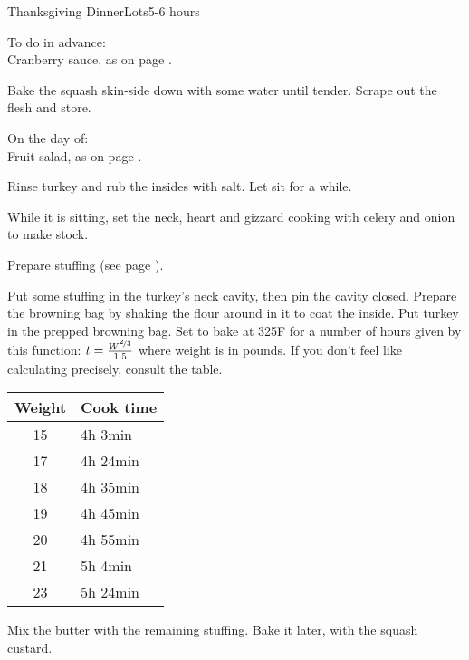\documentclass[../Cookbook.tex]{subfiles}
\begin{document}
\begin{recipe}{Thanksgiving Dinner}{Lots}{5-6 hours}

To do in advance: \\
Cranberry sauce, as on page \pageref{CranberrySauce}.

Bake the squash skin-side down with some water until tender.
Scrape out the flesh and store.

\newstep
On the day of: \\
Fruit salad, as on page \pageref{FruitSalad}.

Rinse turkey and rub the insides with salt. Let sit for a while.

While it is sitting, set the neck, heart and gizzard cooking with celery and onion to make stock.

Prepare stuffing (see page \pageref{Stuffing}).

\begin{minipage}{.7\textwidth}
	Put some stuffing in the turkey's neck cavity, then pin the cavity closed.
	Prepare the browning bag by shaking the flour around in it to coat the inside.
	Put turkey in the prepped browning bag.
	Set to bake at 325\0F for a number of hours given by this function:
	$ t = \frac{W^{\nicefrac{2}{3}}}{1.5} $
	where weight is in pounds.
	If you don't feel like calculating precisely, consult the table.
\end{minipage}
\begin{minipage}{.29\textwidth}
	\begin{tabular}{c|l}
		Weight & Cook time \\ \hline
		15 & 4h 3min \\
		17 & 4h 24min \\
		18 & 4h 35min \\
		19 & 4h 45min \\
		20 & 4h 55min \\
		21 & 5h 4min \\
		23 & 5h 24min
	\end{tabular}
\end{minipage}

Mix the butter with the remaining stuffing. Bake it later, with the squash custard.


\end{recipe}
\end{document}
